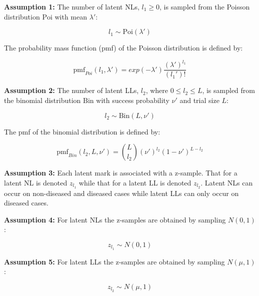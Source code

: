 \documentclass[
]{book}
\begin{document}
\textbf{Assumption 1:} The number of latent NLs, \(l_1 \geq 0\), is sampled from the Poisson distribution \(\text{Poi}\) with mean \(\lambda'\):

\begin{equation} 
l_1 \sim \text{Poi}\left ( \lambda' \right ) 
\label{eq:rsm-poisson-sampling}
\end{equation}

The probability mass function (pmf) of the Poisson distribution is defined by:

\begin{equation} 
\text{pmf}_{Poi}\left ( l_1, \lambda' \right ) = exp\left ( -\lambda' \right ) \frac{{(\lambda')^{l_1}}}{(l_1')!}
\label{eq:rsm-poisson-pmf}
\end{equation}

\textbf{Assumption 2:} The number of latent LLs, \(l_2\), where \(0 \leq l_2 \leq L\), is sampled from the binomial distribution \(\text{Bin}\) with success probability \(\nu'\) and trial size \(L\):

\begin{equation} 
l_2 \sim \text{Bin}\left ( L, \nu' \right ) 
\label{eq:rsm-binomial-sampling}
\end{equation}

The pmf of the binomial distribution is defined by:

\begin{equation} 
\text{pmf}_{Bin}\left ( l_2, L, \nu' \right ) = \binom{L}{l_2} \left (\nu'  \right )^{l_2} \left (1-\nu'  \right )^{L-l_2}
\label{eq:rsm-binomial-pmf}
\end{equation}

\textbf{Assumption 3:} Each latent mark is associated with a z-sample. That for a latent NL is denoted \(z_{l_1}\) while that for a latent LL is denoted \(z_{l_2}\). Latent NLs can occur on non-diseased and diseased cases while latent LLs can only occur on diseased cases.

\textbf{Assumption 4:} For latent NLs the z-samples are obtained by sampling \(N \left ( 0, 1 \right )\):

\begin{equation} 
z_{l_1} \sim N \left ( 0, 1 \right )
\label{eq:rsm-sampling-l1}
\end{equation}

\textbf{Assumption 5:} For latent LLs the z-samples are obtained by sampling \(N \left ( \mu, 1 \right )\):

\begin{equation} 
z_{l_2} \sim N \left ( \mu, 1 \right )
\label{eq:rsm-sampling-l2}
\end{equation}
\end{document}
